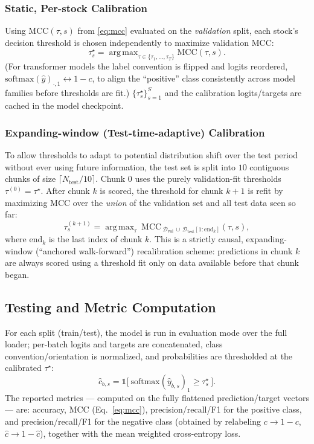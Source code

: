 \documentclass[stu,floatsintext]{apa7}
\newcommand{\I}{\mathbb{1}}
\DeclareMathOperator*{\argmax}{arg\,max}
\begin{document}
\subsubsection{Static, Per-stock Calibration}
Using $\mathrm{MCC}(\tau,s)$ from \eqref{eq:mcc} evaluated on the \emph{validation} split, each stock's
decision threshold is chosen independently to maximize validation MCC:
\begin{equation}
  \tau_s^\star = \argmax_{\tau\in\{\tau_1,\dots,\tau_T\}} \mathrm{MCC}(\tau,s).
\end{equation}
(For transformer models the label convention is flipped and logits reordered, $\mathrm{softmax}(\hat
y)_{\cdot,1}\!\leftrightarrow\!1-c$, to align the ``positive'' class consistently across model families
before thresholds are fit.) $\{\tau_s^\star\}_{s=1}^S$ and the calibration logits/targets are cached in the
model checkpoint.

\subsubsection{Expanding-window (Test-time-adaptive) Calibration}
To allow thresholds to adapt to potential distribution shift over the test period without ever using
future information, the test set is split into $10$ contiguous chunks of size
$\lceil N_{\mathrm{test}}/10\rceil$. Chunk $0$ uses the purely validation-fit thresholds
$\tau^{(0)}=\tau^\star$. After chunk $k$ is scored, the threshold for chunk $k+1$ is
refit by maximizing MCC over the \emph{union} of the validation set and all test data seen so far:
\begin{equation}
  \tau^{(k+1)}_s = \argmax_{\tau} \ \mathrm{MCC}_{\ \mathcal D_{\mathrm{val}}\,\cup\,\mathcal D_{\mathrm{test}}[1:\mathrm{end}_k]}(\tau,s),
\end{equation}
where $\mathrm{end}_k$ is the last index of chunk $k$. This is a strictly causal, expanding-window
(``anchored walk-forward'') recalibration scheme: predictions in chunk $k$ are always scored using a
threshold fit only on data available before that chunk began.

\subsection{Testing and Metric Computation}

For each split (train/test), the model is run in evaluation mode over the full loader; per-batch logits and
targets are concatenated, class convention/orientation is normalized, and probabilities are
thresholded at the calibrated $\tau^\star$:
\begin{equation}
  \hat c_{b,s} = \I\bigl[\ \mathrm{softmax}(\hat y_{b,s})_1 \ge \tau^\star_s\ \bigr].
\end{equation}
The reported metrics — computed on the fully flattened prediction/target vectors — are: accuracy,
$\mathrm{MCC}$ (Eq.~\ref{eq:mcc}), precision/recall/F1 for the positive class, and precision/recall/F1 for
the negative class (obtained by relabeling $c\to 1-c$, $\hat c\to 1-\hat c$), together with the mean
weighted cross-entropy loss.
\end{document}
